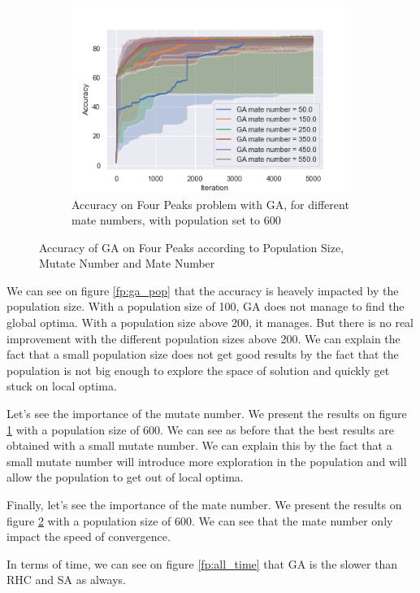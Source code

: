 \documentclass[twocolumn, 10pt]{article}
\begin{document}
\begin{figure}[h]
\begin{subfigure}[t]{\columnwidth}
						\label{fp:ga_mutate}
					\end{subfigure}
					~
					\begin{subfigure}[t]{\columnwidth}
						\centering
						\includegraphics[width=0.68\linewidth]{../graphics/four_peaks_GA_Iteration_Error_GA_mate_number.png}
						\caption{Accuracy on Four Peaks problem with GA, for different mate numbers, with population set to 600}
						\label{fp:ga_mate}
					\end{subfigure}
					\caption{Accuracy of GA on Four Peaks according to Population Size, Mutate Number and Mate Number}
					\label{fp:ga}
				\end{figure}

				We can see on figure \ref{fp:ga_pop} that the accuracy is heavely impacted by the population size. With a population size of 100, GA does not manage to find the global optima. With a population size above 200, it manages. But there is no real improvement with the different population sizes above 200. We can explain the fact that a small population size does not get good results by the fact that the population is not big enough to explore the space of solution and quickly get stuck on local optima.

				Let's see the importance of the mutate number. We present the results on figure \ref{fp:ga_mutate} with a population size of 600. We can see as before that the best results are obtained with a small mutate number. We can explain this by the fact that a small mutate number will introduce more exploration in the population and will allow the population to get out of local optima.

				Finally, let's see the importance of the mate number. We present the results on figure \ref{fp:ga_mate} with a population size of 600. We can see that the mate number only impact the speed of convergence.

				In terms of time, we can see on figure \ref{fp:all_time} that GA is the slower than RHC and SA as always.
\end{document}
